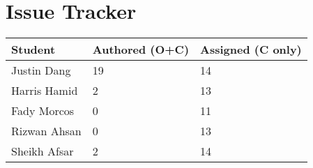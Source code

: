\documentclass{article}
\begin{document}

\section{Issue Tracker}


\begin{table}[H]
\centering
\begin{tabular}{lll}
\toprule
\textbf{Student} & \textbf{Authored (O+C)} & \textbf{Assigned (C only)}\\
\midrule
Justin Dang & 19 & 14 \\
Harris Hamid & 2 & 13 \\
Fady Morcos & 0 & 11 \\
Rizwan Ahsan & 0 & 13 \\
Sheikh Afsar & 2 & 14 \\
\bottomrule
\end{tabular}
\end{table}

\end{document}
